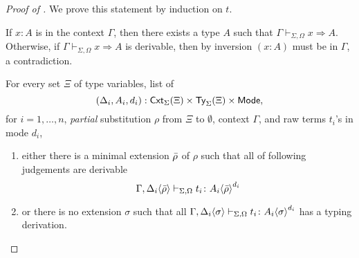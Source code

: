 \begin{proof}[Proof of {}]
  We prove this statement by induction on $t$.

  \begin{description}
    \item[(var)] If $x : A$ is in the context $\Gamma$, then there exists a type $A$ such that $\Gamma \vdash_{\Sigma, \Omega} x \Rightarrow A$.
      Otherwise, if $\Gamma \vdash_{\Sigma, \Omega} x \Rightarrow A$ is derivable, then by inversion $(x : A)$ must be in $\Gamma$, a contradiction.
    \item[(anno)]
    \item[(sub)]
    \item For every set $\Xi$ of type variables, list of
      \[
        \left(\Delta_i, A_i, d_i\right) : \mathsf{Cxt}_{\Sigma}(\Xi) \times \mathsf{Ty}_{\Sigma}(\Xi) \times \mathsf{Mode}, 
      \]
      for $i = 1, \ldots, n$, \emph{partial} substitution $\rho$ from $\Xi$ to $\emptyset$, context $\Gamma$, and raw terms $t_i$'s in mode $d_i$,
      \begin{enumerate}
        \item either there is a minimal extension $\bar{\rho}$ of $\rho$ such that all     of following judgements are derivable
          \[
            \Gamma, {\Delta_i}\!\left<{\bar{\rho}}\right> \vdash_{\Sigma, \Omega} t_i \colon {A_i}\!\left<{\bar{\rho}}\right>^{d_i}
          \]

        \item or there is no extension $\sigma$ such that all $\Gamma, {\Delta_i}\!\left<{\sigma}\right> \vdash_{\Sigma, \Omega} t_i \colon {A_i}\!\left<{\sigma}\right>^{d_i}$ has a typing derivation. 
      \end{enumerate}
  \end{description}
\end{proof}
